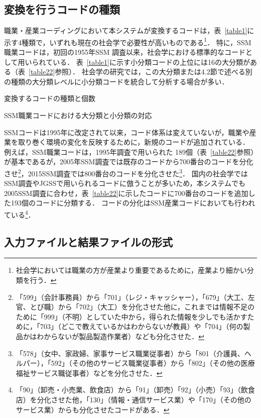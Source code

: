 \documentclass[japanese]{jnlp_1.4}
\begin{document}
\subsection{変換を行うコードの種類}

職業・産業コーディングにおいて本システムが変換するコードは，表~\ref{table1}に示す4種類で，いずれも現在の社会学で必要性が高いものである\footnote{社会学においては職業の方が産業より重要であるために，産業より細かい分類を行う．}．
特に，SSM職業コードは，初回の1955年SSM 調査以来，社会学における標準的なコードとして用いられている．
表~\ref{table1}に示す小分類コードの上位には16の大分類がある（表~\ref{table22}参照）．
社会学の研究では，この大分類または4.2節で述べる別の種類の大分類レベルに小分類コードを統合して分析する場合が多い．

\begin{table}[b]
\caption{変換するコードの種類と個数}
\label{table1}

\end{table}
\begin{table}[b]
\caption{SSM職業コードにおける大分類と小分類の対応}
\label{table22}

\end{table}

SSMコードは1995年に改定されて以来，コード体系は変えていないが，職業や産業を取り巻く環境の変化を反映するために，新規のコードが追加されている．
例えば，SSM職業コードは，1995年調査で用いられた
189個（表~\ref{table22}参照）が基本であるが，2005年SSM調査では既存のコードから700番台のコードを分化させ\footnote{「599」（会計事務員）から「701」（レジ・キャッシャー），「679」（大工、左官、とび職）から「702」（大工）を分化させた他に，これまでは情報不足のために「999」（不明）としていた中から，得られた情報を少しでも活かすために，「703」（どこで教えているかはわからないが教員）や「704」（何の製品かはわからないが製品製造作業者）なども分化させた．}，2015SSM調査では800番台のコードを分化させた\footnote{ 「578」（女中、家政婦、家事サービス職業従事者）から「801（介護員、ヘルパー），「592」（その他のサービス職業従事者）から「802」（その他の医療福祉サービス職従事者）などを分化させた．}．
国内の社会学ではSSM調査やJGSSで用いられるコードに倣うことが多いため，本システムでも2005SSM調査に合わせ，表~\ref{table22}に示したコードに700番台のコードを追加した193個のコードに分類する． 
コードの分化はSSM産業コードにおいても行われている\footnote{「90」（卸売・小売業、飲食店）から「91」（卸売）「92」（小売）「93」（飲食店）を分化させた他，「130」（情報・通信サービス業）や「170」（その他のサービス業）からも分化させたコードがある．}．
 

\subsection{入力ファイルと結果ファイルの形式}
\end{document}

